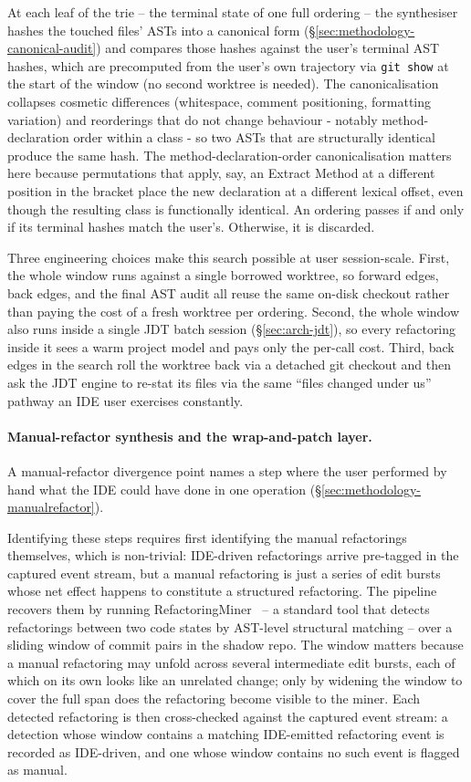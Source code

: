At each leaf of the trie -- the terminal state of one full ordering -- the synthesiser hashes the touched files' ASTs into a canonical form (\S\ref{sec:methodology-canonical-audit}) and compares those hashes against the user's terminal AST hashes, which are precomputed from the user's own trajectory via \texttt{git show} at the start of the window (no second worktree is needed). The canonicalisation collapses cosmetic differences (whitespace, comment positioning, formatting variation) and reorderings that do not change behaviour - notably method-declaration order within a class - so two ASTs that are structurally identical produce the same hash. The method-declaration-order canonicalisation matters here because permutations that apply, say, an Extract Method at a different position in the bracket place the new declaration at a different lexical offset, even though the resulting class is functionally identical. An ordering passes if and only if its terminal hashes match the user's. Otherwise, it is discarded.

Three engineering choices make this search possible at user session-scale. First, the whole window runs against a single borrowed worktree, so forward edges, back edges, and the final AST audit all reuse the same on-disk checkout rather than paying the cost of a fresh worktree per ordering. Second, the whole window also runs inside a single JDT batch session (\S\ref{sec:arch-jdt}), so every refactoring inside it sees a warm project model and pays only the per-call cost. Third, back edges in the search roll the worktree back via a detached git checkout and then ask the JDT engine to re-stat its files via the same ``files changed under us'' pathway an IDE user exercises constantly.

\paragraph{Manual-refactor synthesis and the wrap-and-patch layer.}
\label{sec:arch-wrap-patch}
A manual-refactor divergence point names a step where the user performed by hand what the IDE could have done in one operation (\S\ref{sec:methodology-manualrefactor}).

Identifying these steps requires first identifying the manual refactorings themselves, which is non-trivial: IDE-driven refactorings arrive pre-tagged in the captured event stream, but a manual refactoring is just a series of edit bursts whose net effect happens to constitute a structured refactoring. The pipeline recovers them by running RefactoringMiner~\cite{alikhanifard2025rminer} -- a standard tool that detects refactorings between two code states by AST-level structural matching -- over a sliding window of commit pairs in the shadow repo. The window matters because a manual refactoring may unfold across several intermediate edit bursts, each of which on its own looks like an unrelated change; only by widening the window to cover the full span does the refactoring become visible to the miner. Each detected refactoring is then cross-checked against the captured event stream: a detection whose window contains a matching IDE-emitted refactoring event is recorded as IDE-driven, and one whose window contains no such event is flagged as manual.

